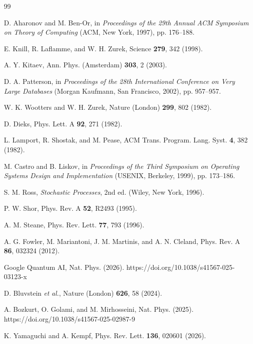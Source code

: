 \documentclass[aps,prl,twocolumn,superscriptaddress,showpacs]{revtex4-2}
\begin{document}


\begin{thebibliography}{99}

D. Aharonov and M. Ben-Or, in \textit{Proceedings of the 29th Annual ACM Symposium on Theory of Computing} (ACM, New York, 1997), pp. 176--188.

E. Knill, R. Laflamme, and W. H. Zurek, Science \textbf{279}, 342 (1998).

A. Y. Kitaev, Ann. Phys. (Amsterdam) \textbf{303}, 2 (2003).

D. A. Patterson, in \textit{Proceedings of the 28th International Conference on Very Large Databases} (Morgan Kaufmann, San Francisco, 2002), pp. 957--957.

W. K. Wootters and W. H. Zurek, Nature (London) \textbf{299}, 802 (1982).

D. Dieks, Phys. Lett. A \textbf{92}, 271 (1982).

L. Lamport, R. Shostak, and M. Pease, ACM Trans. Program. Lang. Syst. \textbf{4}, 382 (1982).

M. Castro and B. Liskov, in \textit{Proceedings of the Third Symposium on Operating Systems Design and Implementation} (USENIX, Berkeley, 1999), pp. 173--186.

S. M. Ross, \textit{Stochastic Processes}, 2nd ed. (Wiley, New York, 1996).

P. W. Shor, Phys. Rev. A \textbf{52}, R2493 (1995).

A. M. Steane, Phys. Rev. Lett. \textbf{77}, 793 (1996).

A. G. Fowler, M. Mariantoni, J. M. Martinis, and A. N. Cleland, Phys. Rev. A \textbf{86}, 032324 (2012).

Google Quantum AI, Nat. Phys. (2026). https://doi.org/10.1038/s41567-025-03123-x

D. Bluvstein \textit{et al.}, Nature (London) \textbf{626}, 58 (2024).

A. Bozkurt, O. Golami, and M. Mirhosseini, Nat. Phys. (2025). https://doi.org/10.1038/s41567-025-02987-9

K. Yamaguchi and A. Kempf, Phys. Rev. Lett. \textbf{136}, 020601 (2026).

\end{thebibliography}
\end{document}
